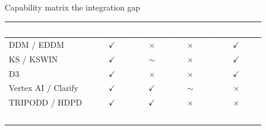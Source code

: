 \documentclass[aspectratio=169,10pt,t,xcolor={table}]{beamer}
\begin{document}
\begin{frame}{Capability matrix \textbar{} the integration gap}
\vspace{0.2em}
\centering
{}

\vspace{0.5em}
\centering
\renewcommand{\arraystretch}{1.25}
\setlength{\tabcolsep}{8pt}
{\footnotesize
\begin{tabular}{@{}>{\raggedright\arraybackslash}p{3.6cm} c c c c@{}}
\toprule
\rowcolor{eaddDeep!90}
\textcolor{white}{\textbf{Approach}} & \textcolor{white}{\textbf{Whether}} &
\textcolor{white}{\textbf{Which}}    & \textcolor{white}{\textbf{Severity}}  &
\textcolor{white}{\textbf{Streaming}} \\
\midrule
DDM / EDDM          & {\color{eaddLime}$\checkmark$} & {\color{eaddCoral}$\times$} & {\color{eaddCoral}$\times$} & {\color{eaddLime}$\checkmark$} \\
KS / KSWIN          & {\color{eaddLime}$\checkmark$} & {\color{eaddAmber!70!black}$\sim$} & {\color{eaddCoral}$\times$} & {\color{eaddLime}$\checkmark$} \\
D3                  & {\color{eaddLime}$\checkmark$} & {\color{eaddCoral}$\times$} & {\color{eaddCoral}$\times$} & {\color{eaddLime}$\checkmark$} \\
Vertex AI / Clarify & {\color{eaddLime}$\checkmark$} & {\color{eaddLime}$\checkmark$} & {\color{eaddAmber!70!black}$\sim$} & {\color{eaddCoral}$\times$} \\
TRIPODD / HDPD      & {\color{eaddLime}$\checkmark$} & {\color{eaddLime}$\checkmark$} & {\color{eaddCoral}$\times$} & {\color{eaddCoral}$\times$} \\
\midrule
\rowcolor{eaddTeal!85}
\textcolor{white}{\textbf{EADD (this work)}} &
\textcolor{white}{$\checkmark$} & \textcolor{white}{$\checkmark$} &
\textcolor{white}{$\checkmark$} & \textcolor{white}{$\checkmark$} \\
\bottomrule
\end{tabular}}
\end{frame}
\end{document}
